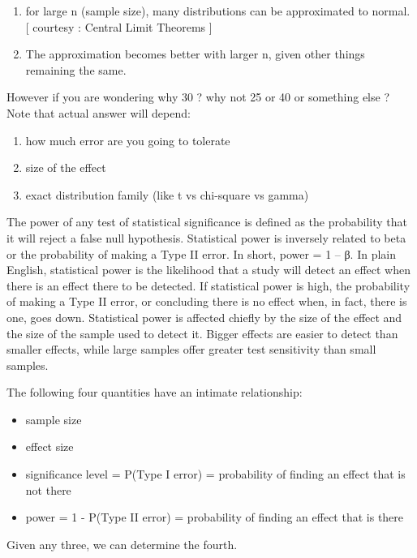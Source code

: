 \documentclass[]{book}
\theoremstyle{definition}
\theoremstyle{definition}
\theoremstyle{definition}
\theoremstyle{remark}
\begin{document}
\begin{enumerate}
\def\labelenumi{\arabic{enumi})}
\item
  for large n (sample size), many distributions can be approximated to
  normal. {[} courtesy : Central Limit Theorems {]}
\item
  The approximation becomes better with larger n, given other things
  remaining the same.
\end{enumerate}

However if you are wondering why 30 ? why not 25 or 40 or something else
? Note that actual answer will depend:

\begin{enumerate}
\def\labelenumi{\arabic{enumi})}
\item
  how much error are you going to tolerate
\item
  size of the effect
\item
  exact distribution family (like t vs chi-square vs gamma)
\end{enumerate}

The power of any test of statistical significance is defined as the
probability that it will reject a false null hypothesis. Statistical
power is inversely related to beta or the probability of making a Type
II error. In short, power = 1 -- β. In plain English, statistical power
is the likelihood that a study will detect an effect when there is an
effect there to be detected. If statistical power is high, the
probability of making a Type II error, or concluding there is no effect
when, in fact, there is one, goes down. Statistical power is affected
chiefly by the size of the effect and the size of the sample used to
detect it. Bigger effects are easier to detect than smaller effects,
while large samples offer greater test sensitivity than small samples.

The following four quantities have an intimate relationship:

\begin{itemize}
\item
  sample size
\item
  effect size
\item
  significance level = P(Type I error) = probability of finding an
  effect that is not there
\item
  power = 1 - P(Type II error) = probability of finding an effect that
  is there
\end{itemize}

Given any three, we can determine the fourth.
\end{document}
